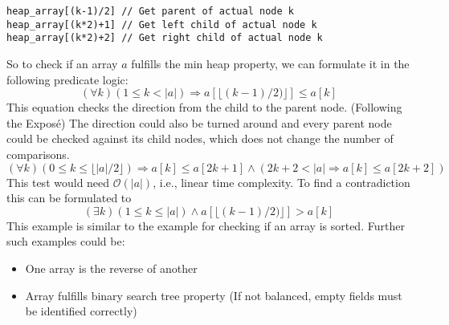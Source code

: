 \documentclass{article}
\begin{document}
\begin{lstlisting}[language=Solidity, style=Solidity, numbers=none, caption=Access a heap in array representation]
heap_array[(k-1)/2] // Get parent of actual node k
heap_array[(k*2)+1] // Get left child of actual node k
heap_array[(k*2)+2] // Get right child of actual node k
\end{lstlisting}
So to check if an array $a$ fulfills the min heap property, we can formulate it in the following predicate logic:
\begin{equation}\label{eq:heap-unversial_1}
  (\forall k) (1 \le k < |a|) \Rightarrow a[\lfloor(k-1)/2)\rfloor] \le a[k]
\end{equation}
This equation checks the direction from the child to the parent node. (Following the Exposé) The direction could also be turned around and every parent node could be checked against its child nodes, which does not change the number of comparisons.
\begin{equation}\label{eq:heap-unversial_2}
  (\forall k) (0 \le k \le \lfloor |a|/2 \rfloor) \Rightarrow a[k] \le a[2k+1] \land (2k+2 < |a| \Rightarrow a[k] \le a[2k+2])
\end{equation}
This test would need $\mathcal{O}(|a|)$, i.e., linear time complexity. To find a contradiction this can be formulated to
\begin{equation}\label{eq:heap-unversial_3}
  (\exists k) (1 \le k \le |a|) \land a[\lfloor(k-1)/2)\rfloor] > a[k]
\end{equation}
This example is similar to the example for checking if an array is sorted. Further such examples could be:
\begin{itemize}
    \item One array is the reverse of another
    \item Array fulfills binary search tree property (If not balanced, empty fields must be identified correctly)
\end{itemize}

\end{document}
